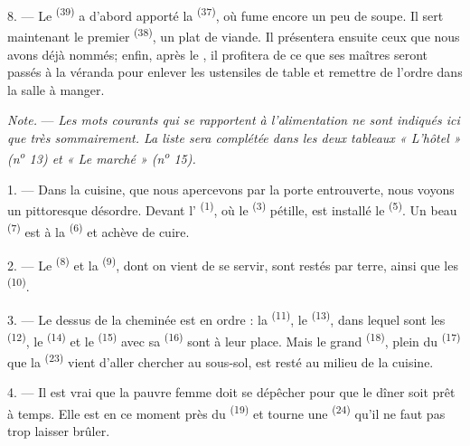 8. --- Le  \textsuperscript{(39)} a d'abord apporté la
 \textsuperscript{(37)}, où fume encore un peu de soupe. Il
sert maintenant le premier  \textsuperscript{(38)}, un plat de
viande. Il présentera ensuite ceux que nous avons déjà nommés; enfin, après le
, il profitera de ce que ses maîtres seront passés à la véranda
pour enlever les ustensiles de table et remettre de l'ordre dans la salle à
manger.

\textit{Note.} --- \textit{Les mots courants qui se rapportent à
l'alimentation ne sont indiqués ici que très sommairement. La liste sera
complétée dans les deux tableaux « L'hôtel » (n\textsuperscript{o} 13) et « Le
marché » (n\textsuperscript{o} 15).}

\VUsaut{4.6mm}
\VUsaut{3.0mm}

1. --- Dans la cuisine, que nous apercevons par la porte entrouverte, nous
voyons un pittoresque désordre. Devant l' \textsuperscript{(1)},
où le  \textsuperscript{(3)} pétille, est installé le
 \textsuperscript{(5)}. Un beau 
\textsuperscript{(7)} est à la  \textsuperscript{(6)} et achève
de cuire.

2. --- Le  \textsuperscript{(8)} et la  \textsuperscript{(9)}, dont on vient de se servir, sont restés par
terre, ainsi que les  \textsuperscript{(10)}.

3. --- Le dessus de la cheminée est en ordre : la 
\textsuperscript{(11)}, le  \textsuperscript{(13)},
dans lequel sont les  \textsuperscript{(12)}, le
 \textsuperscript{(14)} et le 
\textsuperscript{(15)} avec sa  \textsuperscript{(16)} sont à
leur place. Mais le grand  \textsuperscript{(18)},
plein du  \textsuperscript{(17)} que la
 \textsuperscript{(23)} vient d'aller chercher au sous-sol,
est resté au milieu de la cuisine.

4. --- Il est vrai que la pauvre femme doit se dépêcher pour que le dîner soit
prêt à temps. Elle est en ce moment près du 
\textsuperscript{(19)} et tourne une  \textsuperscript{(24)}
qu'il ne faut pas trop laisser brûler.

